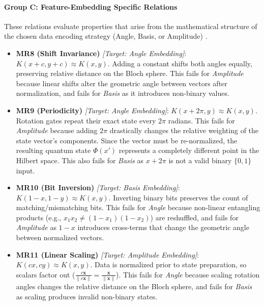 \documentclass[12pt,a4paper]{article}
\begin{document}
	
	\paragraph{Group C: Feature-Embedding Specific Relations}
	These relations evaluate properties that arise from the mathematical structure of the chosen data encoding strategy (Angle, Basis, or Amplitude) \cite{zaman2025surveyquantummachinelearning, schuld2018}.
	
	\begin{itemize}
		\item \textbf{MR8 (Shift Invariance)} \textit{[Target: Angle Embedding]}: $K(x+c, y+c) \approx K(x,y)$. Adding a constant shifts both angles equally, preserving relative distance on the Bloch sphere. This fails for \textit{Amplitude} because linear shifts alter the geometric angle between vectors after normalization, and fails for \textit{Basis} as it introduces non-binary values. \cite{havlicek2019}
		
		\item \textbf{MR9 (Periodicity)} \textit{[Target: Angle Embedding]}: $K(x+2\pi, y) \approx K(x,y)$. Rotation gates repeat their exact state every $2\pi$ radians. This fails for \textit{Amplitude} because adding $2\pi$ drastically changes the relative weighting of the state vector's components. Since the vector must be re-normalized, the resulting quantum state $\Phi(x')$ represents a completely different point in the Hilbert space. This also fails for \textit{Basis} as $x+2\pi$ is not a valid binary $\{0, 1\}$ input. \cite{Sweke2020, havlicek2019}
		
		\item \textbf{MR10 (Bit Inversion)} \textit{[Target: Basis Embedding]}: $K(1-x, 1-y) \approx K(x,y)$. Inverting binary bits preserves the count of matching/mismatching bits. This fails for \textit{Angle} because non-linear entangling products (e.g., $x_1 x_2 \neq (1-x_1)(1-x_2)$) are reshuffled, and fails for \textit{Amplitude} as $1-x$ introduces cross-terms that change the geometric angle between normalized vectors. \cite{Dwarakanath2018}
		
		\item \textbf{MR11 (Linear Scaling)} \textit{[Target: Amplitude Embedding]}: $K(cx, cy) \approx K(x,y)$. Data is normalized prior to state preparation, so scalars factor out ($\frac{c\mathbf{x}}{\|c\mathbf{x}\|} = \frac{\mathbf{x}}{\|\mathbf{x}\|}$). This fails for \textit{Angle} because scaling rotation angles changes the relative distance on the Bloch sphere, and fails for \textit{Basis} as scaling produces invalid non-binary states. \cite{mottonen2004}
		

\end{itemize}
\end{document}
